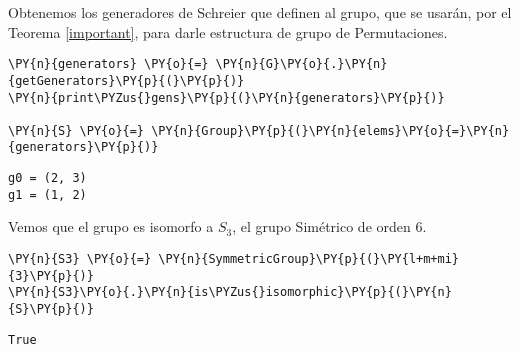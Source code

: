 \begin{enumerate}
    \begin{center}
    \end{center}

Obtenemos los generadores de Schreier que definen al grupo, que se usarán, por el Teorema \ref{important}, para darle estructura de grupo de Permutaciones.

    \begin{tcolorbox}[breakable, size=fbox, boxrule=1pt, pad at break*=1mm,colback=cellbackground, colframe=cellborder]
\begin{Verbatim}[commandchars=\\\{\}]
\PY{n}{generators} \PY{o}{=} \PY{n}{G}\PY{o}{.}\PY{n}{getGenerators}\PY{p}{(}\PY{p}{)}
\PY{n}{print\PYZus{}gens}\PY{p}{(}\PY{n}{generators}\PY{p}{)}

\PY{n}{S} \PY{o}{=} \PY{n}{Group}\PY{p}{(}\PY{n}{elems}\PY{o}{=}\PY{n}{generators}\PY{p}{)}
\end{Verbatim}
\end{tcolorbox}


\begin{tcolorbox}[breakable, size=fbox, boxrule=.5pt, pad at break*=1mm, opacityfill=0]
    \begin{Verbatim}[commandchars=\\\{\}]
g0 = (2, 3)
g1 = (1, 2)
    \end{Verbatim}
\end{tcolorbox}

Vemos que el grupo es isomorfo a $S_3$, el grupo Simétrico de orden $6$.

    \begin{tcolorbox}[breakable, size=fbox, boxrule=1pt, pad at break*=1mm,colback=cellbackground, colframe=cellborder]
\begin{Verbatim}[commandchars=\\\{\}]
\PY{n}{S3} \PY{o}{=} \PY{n}{SymmetricGroup}\PY{p}{(}\PY{l+m+mi}{3}\PY{p}{)}
\PY{n}{S3}\PY{o}{.}\PY{n}{is\PYZus{}isomorphic}\PY{p}{(}\PY{n}{S}\PY{p}{)}
\end{Verbatim}
\end{tcolorbox}

            \begin{tcolorbox}[breakable, size=fbox, boxrule=.5pt, pad at break*=1mm, opacityfill=0]
\begin{Verbatim}[commandchars=\\\{\}]
True
\end{Verbatim}
\end{tcolorbox}
        


\end{enumerate}
